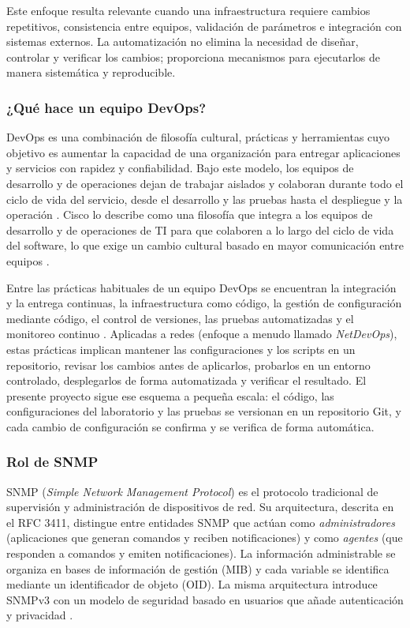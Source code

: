 Este enfoque resulta relevante cuando una infraestructura requiere cambios repetitivos, consistencia entre equipos, validación de parámetros e integración con sistemas externos. La automatización no elimina la necesidad de diseñar, controlar y verificar los cambios; proporciona mecanismos para ejecutarlos de manera sistemática y reproducible.

\subsubsection{¿Qué hace un equipo DevOps?}
DevOps es una combinación de filosofía cultural, prácticas y herramientas cuyo objetivo es aumentar la capacidad de una organización para entregar aplicaciones y servicios con rapidez y confiabilidad. Bajo este modelo, los equipos de desarrollo y de operaciones dejan de trabajar aislados y colaboran durante todo el ciclo de vida del servicio, desde el desarrollo y las pruebas hasta el despliegue y la operación \parencite{aws_devops}. Cisco lo describe como una filosofía que integra a los equipos de desarrollo y de operaciones de TI para que colaboren a lo largo del ciclo de vida del software, lo que exige un cambio cultural basado en mayor comunicación entre equipos \parencite{cisco_devops}.

Entre las prácticas habituales de un equipo DevOps se encuentran la integración y la entrega continuas, la infraestructura como código, la gestión de configuración mediante código, el control de versiones, las pruebas automatizadas y el monitoreo continuo \parencite{aws_devops}. Aplicadas a redes (enfoque a menudo llamado \textit{NetDevOps}), estas prácticas implican mantener las configuraciones y los scripts en un repositorio, revisar los cambios antes de aplicarlos, probarlos en un entorno controlado, desplegarlos de forma automatizada y verificar el resultado. El presente proyecto sigue ese esquema a pequeña escala: el código, las configuraciones del laboratorio y las pruebas se versionan en un repositorio Git, y cada cambio de configuración se confirma y se verifica de forma automática.

\subsubsection{Rol de SNMP}
SNMP (\textit{Simple Network Management Protocol}) es el protocolo tradicional de supervisión y administración de dispositivos de red. Su arquitectura, descrita en el RFC 3411, distingue entre entidades SNMP que actúan como \textit{administradores} (aplicaciones que generan comandos y reciben notificaciones) y como \textit{agentes} (que responden a comandos y emiten notificaciones). La información administrable se organiza en bases de información de gestión (MIB) y cada variable se identifica mediante un identificador de objeto (OID). La misma arquitectura introduce SNMPv3 con un modelo de seguridad basado en usuarios que añade autenticación y privacidad \parencite{rfc3411}.

